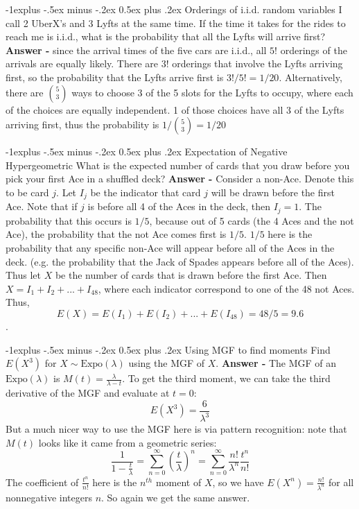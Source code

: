 \documentclass[10pt,landscape]{article}
\makeatletter
\theoremstyle{definition}
\newcommand{\Expo}{\textrm{Expo}}
\renewcommand{\subsection}{\@startsection{subsection}{2}{0mm}%
                                {-1explus -.5ex minus -.2ex}%
                                {0.5ex plus .2ex}%
                                {\normalfont\normalsize\bfseries}}
\makeatother
\begin{document}
\begin{multicols}{3}
\subsection{Orderings of i.i.d. random variables}
I call 2 UberX's and 3 Lyfts at the same time. If the time it takes for the rides to reach me is i.i.d., what is the probability that all the Lyfts will arrive first? \textbf{Answer - } since the arrival times of the five cars are i.i.d., all $5!$ orderings of the arrivals are equally likely. There are $3!$ orderings that involve the Lyfts arriving first, so the probability that the Lyfts arrive first is $\boxed{3!/5! = 1/20}$. Alternatively, there are ${5 \choose 3}$ ways to choose 3 of the 5 slots for the Lyfts to occupy, where each of the choices are equally independent. 1 of those choices have all 3 of the Lyfts arriving first, thus the probability is $\boxed{1 / {5 \choose 3} = 1/20}$

\subsection{Expectation of Negative Hypergeometric}
What is the expected number of cards that you draw before you pick your first Ace in a shuffled deck?
\textbf{Answer -} Consider a non-Ace. Denote this to be card $j$. Let $I_j$ be the indicator that card $j$ will be drawn before the first Ace. Note that if $j$ is before all 4 of the Aces in the deck, then $I_j = 1$. The probability that this occurs is $1/5$, because out of 5 cards (the 4 Aces and the not Ace), the probability that the not Ace comes first is $1/5$. $1/5$ here is the probability that any specific non-Ace will appear before all of the Aces in the deck. (e.g. the probability that the Jack of Spades appears before all of the Aces). Thus let $X$ be the number of cards that is drawn before the first Ace. Then $X = I_1 + I_2 + ... + I_{48}$, where each indicator correspond to one of the 48 not Aces. Thus, \[E(X) = E(I_1) + E(I_2) + ... + E(I_{48}) = 48/5 = \boxed{9.6}\].

\subsection{Using MGF to find moments}
Find $E(X^3)$ for $X \sim \Expo(\lambda)$ using the MGF of $X$. \textbf{Answer - } The MGF of an $\Expo(\lambda)$ is $M(t) = \frac{\lambda}{\lambda-t}$. To get the third moment, we can take the third derivative of the MGF and evaluate at $t=0$: 
\[\boxed{E(X^3) = \frac{6}{\lambda^3}}\]
But a much nicer way to use the MGF here is via pattern recognition: note that $M(t)$ looks like it came from a geometric series:
\[\frac{1}{1-\frac{t}{\lambda}} = \sum^{\infty}_{n=0} \left(\frac{t}{\lambda}\right)^n = \sum^{\infty}_{n=0} \frac{n!}{\lambda^n} \frac{t^n}{n!}\] The coefficient of $\frac{t^n}{n!}$ here is the $n^{th}$ moment of $X$, so we have $E(X^n) = \frac{n!}{\lambda^n}$ for all nonnegative integers $n$. So again we get the same answer.


\end{multicols}
\end{document}
